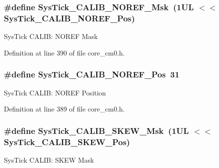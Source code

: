 \subsubsection[{\texorpdfstring{Sys\+Tick\+\_\+\+C\+A\+L\+I\+B\+\_\+\+N\+O\+R\+E\+F\+\_\+\+Msk}{SysTick_CALIB_NOREF_Msk}}]{\setlength{\rightskip}{0pt plus 5cm}\#define Sys\+Tick\+\_\+\+C\+A\+L\+I\+B\+\_\+\+N\+O\+R\+E\+F\+\_\+\+Msk~(1\+U\+L $<$$<$ Sys\+Tick\+\_\+\+C\+A\+L\+I\+B\+\_\+\+N\+O\+R\+E\+F\+\_\+\+Pos)}\hypertarget{group___c_m_s_i_s___sys_tick_ga3af0d891fdd99bcc8d8912d37830edb6}{}\label{group___c_m_s_i_s___sys_tick_ga3af0d891fdd99bcc8d8912d37830edb6}
Sys\+Tick C\+A\+L\+IB\+: N\+O\+R\+EF Mask 

Definition at line 390 of file core\+\_\+cm0.\+h.

\subsubsection[{\texorpdfstring{Sys\+Tick\+\_\+\+C\+A\+L\+I\+B\+\_\+\+N\+O\+R\+E\+F\+\_\+\+Pos}{SysTick_CALIB_NOREF_Pos}}]{\setlength{\rightskip}{0pt plus 5cm}\#define Sys\+Tick\+\_\+\+C\+A\+L\+I\+B\+\_\+\+N\+O\+R\+E\+F\+\_\+\+Pos~31}\hypertarget{group___c_m_s_i_s___sys_tick_ga534dbe414e7a46a6ce4c1eca1fbff409}{}\label{group___c_m_s_i_s___sys_tick_ga534dbe414e7a46a6ce4c1eca1fbff409}
Sys\+Tick C\+A\+L\+IB\+: N\+O\+R\+EF Position 

Definition at line 389 of file core\+\_\+cm0.\+h.

\subsubsection[{\texorpdfstring{Sys\+Tick\+\_\+\+C\+A\+L\+I\+B\+\_\+\+S\+K\+E\+W\+\_\+\+Msk}{SysTick_CALIB_SKEW_Msk}}]{\setlength{\rightskip}{0pt plus 5cm}\#define Sys\+Tick\+\_\+\+C\+A\+L\+I\+B\+\_\+\+S\+K\+E\+W\+\_\+\+Msk~(1\+U\+L $<$$<$ Sys\+Tick\+\_\+\+C\+A\+L\+I\+B\+\_\+\+S\+K\+E\+W\+\_\+\+Pos)}\hypertarget{group___c_m_s_i_s___sys_tick_ga8a6a85a87334776f33d77fd147587431}{}\label{group___c_m_s_i_s___sys_tick_ga8a6a85a87334776f33d77fd147587431}
Sys\+Tick C\+A\+L\+IB\+: S\+K\+EW Mask 


